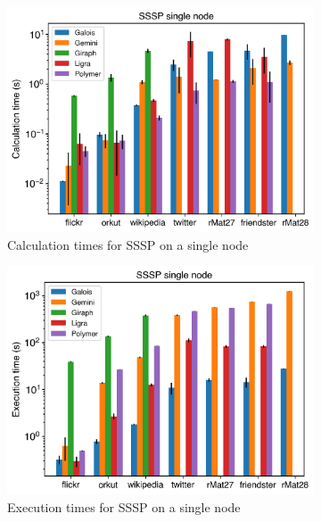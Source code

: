\begin{figure}
	\begin{subfigure}{0.3\textwidth}
		\includegraphics[width=\linewidth]{../../plots/singleNodeSSSP_calcTime.png}
		\caption{Calculation times for SSSP on a single node}
		\label{fig:singleNodeSSSP_calc}
	\end{subfigure}
	\hfil
	\begin{subfigure}{0.3\textwidth}
		\includegraphics[width=\linewidth]{../../plots/singleNodeSSSP_execTime.png}
		\caption{Execution times for SSSP on a single node}
		\label{fig:singleNodeSSSP_exec}
	\end{subfigure}
	\hfil
	\begin{subfigure}{0.3\textwidth}

\end{subfigure}
\end{figure}

